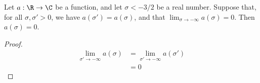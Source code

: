 \begin{lemma}[limitOfConstantLeft]
\label{limitOfConstantLeft}
\leanok
Let $a:\R\to\C$ be a function, and let $\sigma<-3/2$ be a real number. Suppose that, for all
  $\sigma, \sigma'>0$, we have $a(\sigma')=a(\sigma)$, and that
  $\lim_{\sigma\to-\infty}a(\sigma)=0$. Then $a(\sigma)=0$.
\end{lemma}
\begin{proof}
\leanok
\begin{align*}
    \lim_{\sigma'\to-\infty}a(\sigma) &= \lim_{\sigma'\to-\infty}a(\sigma') \\
    &= 0
  \end{align*}
\end{proof}
